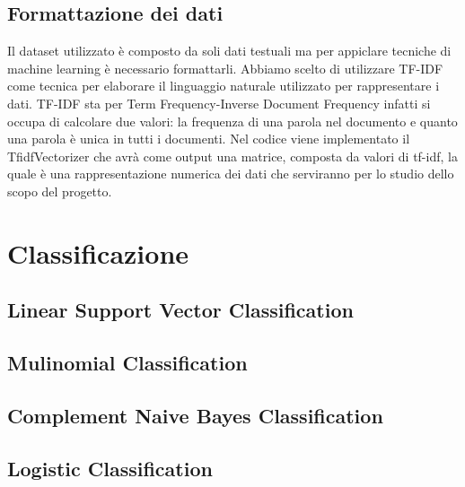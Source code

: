 \documentclass[12pt,oneside]{article}
\begin{document}
    \begin{enumerate}
    \subsection{Formattazione dei dati}
    \begin{justify}
    Il dataset utilizzato è composto da soli dati testuali ma per appiclare tecniche di machine learning è necessario formattarli. Abbiamo scelto di utilizzare TF-IDF come tecnica per elaborare il linguaggio naturale utilizzato per rappresentare i dati. TF-IDF sta per Term Frequency-Inverse Document Frequency infatti si occupa di calcolare due valori: la frequenza di una parola nel documento e quanto una parola è unica in tutti i documenti. Nel codice viene implementato il TfidfVectorizer che avrà come output una matrice, composta da valori di tf-idf, la quale è una rappresentazione numerica dei dati che serviranno per lo studio dello scopo del progetto. 
    \end{justify}
    \end{enumerate}


\section{Classificazione}

    \begin{enumerate}
    \subsection{Linear Support Vector Classification  }
    \end{enumerate}
   
    \begin{enumerate}
    \subsection{Mulinomial Classification}
    \end{enumerate}
    
     \begin{enumerate}
    \subsection{Complement Naive Bayes Classification}
    \end{enumerate}
    
    \begin{enumerate}
    \subsection{Logistic Classification}
    \end{enumerate}
\end{document}
